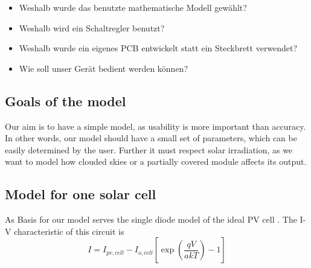 \begin{itemize}
    \item
        Weshalb wurde das benutzte mathematische Modell gew\"ahlt?
    \item
        Weshalb wird ein Schaltregler benutzt?
    \item
        Weshalb wurde ein eigenes PCB entwickelt statt ein Steckbrett verwendet?
    \item
        Wie soll unser Ger\"at bedient werden k\"onnen?
\end{itemize}

\subsection{Goals of the model}
Our aim is to have a simple model, as usability is more important than accuracy. In other words, our model should have a small set of parameters, which can be easily determined by the user. Further it must respect solar irradiation, as we want to model how clouded skies or a partially covered module affects its output.
   
\subsection{Model for one solar cell}
As Basis for our model serves the single diode model of the ideal PV cell . The I-V characteristic of this circuit is
\begin{equation}
 I = I_{pv,cell} - I_{o,cell} \left[ \exp \left( \frac{qV}{akT} \right) - 1 \right]
 \end{equation} 
